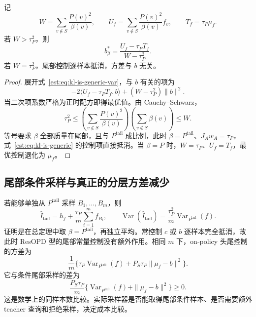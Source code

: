 \documentclass[lang=cn,scheme=chinese,openany]{../book/elegantbook}
\newcommand{\Var}{\operatorname{Var}}
\newcommand{\tail}{\mathrm{tail}}
\begin{document}
\begin{proposition}[任意采样测度下的最优尾部常控制]
记
\begin{equation*}
 W=\sum_{v\notin S}\frac{P(v)^2}{\beta(v)},\qquad
 U_f=\sum_{v\notin S}\frac{P(v)^2}{\beta(v)}f_v,\qquad T_f=\tau_P\mu_f.
\end{equation*}
若 $W>\tau_P^2$，则
\begin{equation*}
 b_\beta^*=\frac{U_f-\tau_PT_f}{W-\tau_P^2}.
\end{equation*}
若 $W=\tau_P^2$，尾部控制逐样本抵消，方差与 $b$ 无关。
\end{proposition}
\begin{proof}
展开式~\eqref{est:eq:kl-is-generic-var}，与 $b$ 有关的项为
\begin{equation*}
 -2\langle U_f-\tau_PT_f,b\rangle+(W-\tau_P^2)\|b\|^2.
\end{equation*}
当二次项系数严格为正时配方即得最优值。由 Cauchy--Schwarz，
\begin{equation*}
 \tau_P^2
 \le\left(\sum_{v\notin S}\frac{P(v)^2}{\beta(v)}\right)
      \left(\sum_{v\notin S}\beta(v)\right)\le W.
\end{equation*}
等号要求 $\beta$ 全部质量在尾部，且与 $P^{\tail}$ 成比例，此时 $\beta=P^{\tail}$、$J_Aw_A=\tau_P$，式~\eqref{est:eq:kl-is-generic} 的控制项直接抵消。当 $\beta=P$ 时，$W=\tau_P$、$U_f=T_f$，最优控制退化为 $\mu_f$。
\end{proof}

\subsection{尾部条件采样与真正的分层方差减少}
若能够单独从 $P^{\tail}$ 采样 $B_1,\ldots,B_m$，则
\begin{equation*}
 \widehat I_\tail=h_f+\frac{\tau_P}{m}\sum_{i=1}^m f_{B_i},
 \qquad
 \Var(\widehat I_\tail)=\frac{\tau_P^2}{m}\Var_{P^{\tail}}(f).
\end{equation*}
证明是在总定理中取 $\beta=P^{\tail}$，再独立平均。常控制 $c$ 或 $b$ 逐样本完全抵消，故此时 ResOPD 型的尾部常量控制没有额外作用。相同 $m$ 下，on-policy 头尾控制的方差为
\begin{equation*}
 \frac1m\{\tau_P\Var_{P^{\tail}}(f)+P_S\tau_P\|\mu_f-b\|^2\}.
\end{equation*}
它与条件尾部采样的差为
\begin{equation*}
 \frac{P_S\tau_P}{m}\{\Var_{P^{\tail}}(f)+\|\mu_f-b\|^2\}\ge0.
\end{equation*}
这是数学上的同样本数比较。实际采样器是否能取得尾部条件样本、是否需要额外 teacher 查询和拒绝采样，决定成本比较。
\end{document}
